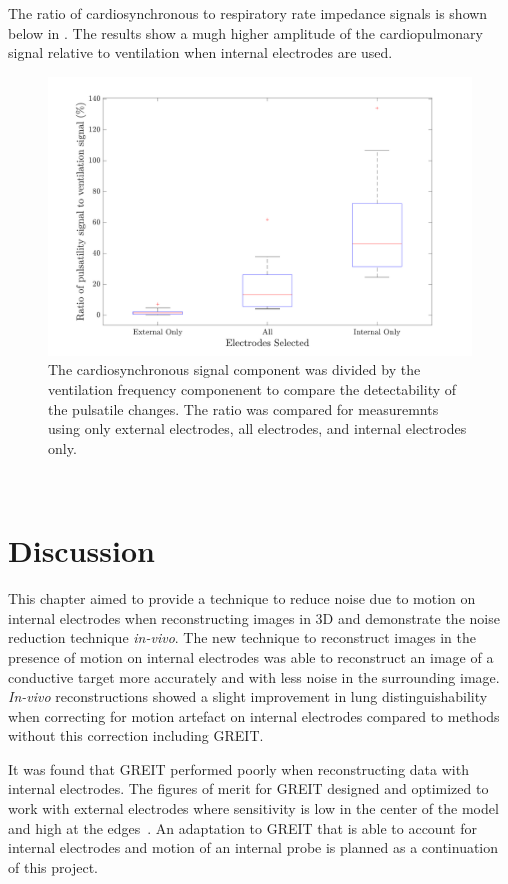 The ratio of cardiosynchronous to respiratory rate impedance signals is shown below in 
. The results show a mugh higher amplitude of the cardiopulmonary 
signal relative to ventilation when internal electrodes are used.

\begin{figure}
    \centering
	\includegraphics[width=\textwidth]{chapter7-internal_elec_motion/imgs/amplitude_ratio.pdf} 
	\caption[Results of the probe location correction]{\label{fig:amplitude_ratio} 
	The cardiosynchronous signal component was divided by the ventilation frequency 
	componenent to compare the detectability of the pulsatile changes. The ratio was compared 
	for measuremnts using only external electrodes, all electrodes, and internal electrodes only.}
\end{figure}~

\section{Discussion}

This chapter aimed to provide a technique to reduce noise due to motion on internal
electrodes when reconstructing images in 3D and demonstrate the noise reduction technique
\emph{in-vivo}. The new technique to reconstruct images in the presence of motion 
on internal electrodes was able to reconstruct an image of a conductive target 
more accurately and with less noise in the surrounding image. \emph{In-vivo}
reconstructions showed a slight improvement in lung distinguishability when correcting
for motion artefact on internal electrodes compared to methods without this correction 
including GREIT. 

It was found that GREIT performed poorly when reconstructing data with internal electrodes.
The figures of merit for GREIT designed and optimized to work with external electrodes 
where sensitivity is low in the center of the model and high at the 
edges~\parencite{adler_greit_2009}. An adaptation to GREIT that is able to 
account for internal electrodes and motion of an internal probe is planned as a
continuation of this project.  

